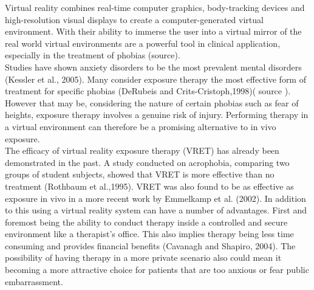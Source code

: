 

%





Virtual reality combines real-time computer graphics, body-tracking devices and high-resolution visual displays to create a computer-generated virtual environment. With their ability to immerse the user into a virtual mirror of the real world virtual environments are a powerful tool in clinical application, especially in the treatment of phobias (source). \\
Studies have shown anxiety disorders to be the most prevalent mental disorders (Kessler et al., 2005). Many consider exposure therapy the most effective form of treatment for specific phobias (DeRubeis and Crits-Cristoph,1998)( source ). However that may be, considering the nature of certain phobias such as fear of heights, exposure therapy involves a genuine risk of injury. Performing therapy in a virtual environment can therefore be a promising alternative to in vivo exposure.\\ 
The efficacy of virtual reality exposure therapy (VRET) has already been demonstrated in the past. A study conducted on acrophobia, comparing two groups of student subjects, showed that VRET is more effective than no treatment (Rothbaum et al.,1995). VRET was also found to be as effective as exposure in vivo in a more recent work by Emmelkamp et al. (2002). 
In addition to this using a virtual reality system can have a number of advantages. First and foremost being the ability to conduct therapy inside a controlled and secure environment like a therapist's office. This also implies therapy being less time consuming and provides financial benefits (Cavanagh and Shapiro, 2004). The possibility of having therapy in a more private scenario also could mean it becoming a more attractive choice for patients that are too anxious or fear public embarrassment. 


